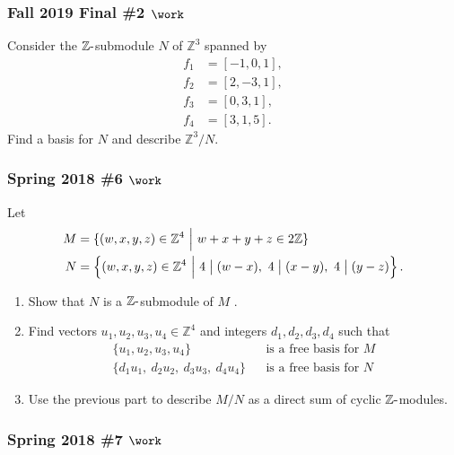 \hypertarget{fall-2019-final-2-work}{%
\subsubsection{\texorpdfstring{Fall 2019 Final \#2
\(\work\)}{Fall 2019 Final \#2 \textbackslash work}}\label{fall-2019-final-2-work}}

Consider the \({\mathbb{Z}}{\hbox{-}}\)submodule \(N\) of
\({\mathbb{Z}}^3\) spanned by
\begin{align*}
f_1 &= [-1, 0, 1], \\
f_2 &= [2,-3,1], \\
f_3 &= [0, 3, 1], \\
f_4 &= [3,1,5]
.\end{align*}
Find a basis for \(N\) and describe \({\mathbb{Z}}^3/N\).

\hypertarget{spring-2018-6-work}{%
\subsubsection{\texorpdfstring{Spring 2018 \#6
\(\work\)}{Spring 2018 \#6 \textbackslash work}}\label{spring-2018-6-work}}

Let
\begin{align*}
M &= \{(w, x, y, z) \in {\mathbb{Z}}^4 {~\mathrel{\Big|}~}w + x + y + z \in 2{\mathbb{Z}}\} \\
N &= \left\{{
(w, x, y, z) \in {\mathbb{Z}}^4 {~\mathrel{\Big|}~}4\bigm|(w - x),~ 4\bigm|(x - y),~ 4\bigm|( y - z)
}\right\}
.\end{align*}

\begin{enumerate}
\def\labelenumi{\alph{enumi}.}
\item
  Show that \(N\) is a \({\mathbb{Z}}{\hbox{-}}\)submodule of \(M\) .
\item
  Find vectors \(u_1 , u_2 , u_3 , u_4 \in {\mathbb{Z}}^4\) and integers
  \(d_1 , d_2 , d_3 , d_4\) such that
  \begin{align*}
  \{
  u_1 , u_2 , u_3 , u_4 
  \} 
  && \text{is a free basis for }M
  \\
  \{
  d_1 u_1,~ d_2 u_2,~ d_3 u_3,~ d_4 u_4 
  \}
  && \text{is a free basis for }N
  \end{align*}
\item
  Use the previous part to describe \(M/N\) as a direct sum of cyclic
  \({\mathbb{Z}}{\hbox{-}}\)modules.
\end{enumerate}

\hypertarget{spring-2018-7-work}{%
\subsubsection{\texorpdfstring{Spring 2018 \#7
\(\work\)}{Spring 2018 \#7 \textbackslash work}}\label{spring-2018-7-work}}

